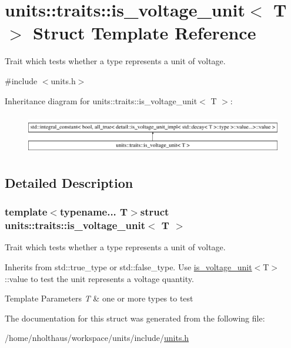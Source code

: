 \hypertarget{structunits_1_1traits_1_1is__voltage__unit}{}\section{units\+:\+:traits\+:\+:is\+\_\+voltage\+\_\+unit$<$ T $>$ Struct Template Reference}
\label{structunits_1_1traits_1_1is__voltage__unit}


Trait which tests whether a type represents a unit of voltage.  




{\ttfamily \#include $<$units.\+h$>$}

Inheritance diagram for units\+:\+:traits\+:\+:is\+\_\+voltage\+\_\+unit$<$ T $>$\+:\begin{figure}[H]
\begin{center}
\leavevmode
\includegraphics[height=1.769352cm]{structunits_1_1traits_1_1is__voltage__unit}
\end{center}
\end{figure}


\subsection{Detailed Description}
\subsubsection*{template$<$typename... T$>$struct units\+::traits\+::is\+\_\+voltage\+\_\+unit$<$ T $>$}

Trait which tests whether a type represents a unit of voltage. 

Inherits from {\ttfamily std\+::true\+\_\+type} or {\ttfamily std\+::false\+\_\+type}. Use {\ttfamily \hyperlink{structunits_1_1traits_1_1is__voltage__unit}{is\+\_\+voltage\+\_\+unit}$<$T$>$\+::value} to test the unit represents a voltage quantity. 
\begin{DoxyTemplParams}{Template Parameters}
{\em T} & one or more types to test \\
\hline
\end{DoxyTemplParams}


The documentation for this struct was generated from the following file\+:\begin{DoxyCompactItemize}
\item 
/home/nholthaus/workspace/units/include/\hyperlink{units_8h}{units.\+h}\end{DoxyCompactItemize}
